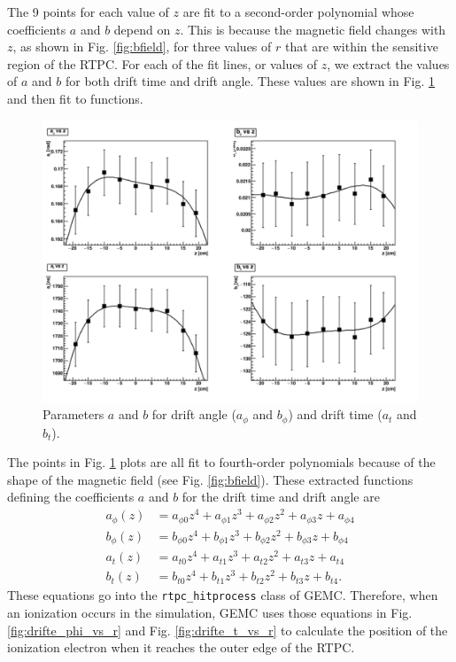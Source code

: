 The 9 points for each value of $z$ are fit to a second-order polynomial whose coefficients $a$ and $b$ depend on $z$. This is because the magnetic field changes with $z$, as shown in Fig. \ref{fig:bfield}, for three values of $r$ that are within the sensitive region of the RTPC. For each of the fit lines, or values of $z$, we extract the values of $a$ and $b$ for both drift time and drift angle. These values are shown in Fig. \ref{fig:drifte_a_and_b} and then fit to functions.

\begin{figure}[h!]
	\centering
	\includegraphics[width=0.8\linewidth]{figures/drifte_a_and_b.png}
	\caption{Parameters $a$ and $b$ for drift angle ($a_{\phi}$ and $b_{\phi}$) and drift time ($a_t$ and $b_t$).}
	\label{fig:drifte_a_and_b}
\end{figure}

The points in Fig. \ref{fig:drifte_a_and_b} plots are all fit to fourth-order polynomials because of the shape of the magnetic field (see Fig. \ref{fig:bfield}). These extracted functions defining the coefficients $a$ and $b$ for the drift time and drift angle are
\begin{eqnarray}\label{eqn:drifte_parameters}
\nonumber
a_{\phi}(z) &= a_{\phi0}z^4 +  a_{\phi1}z^3 +  a_{\phi2}z^2 +  a_{\phi3}z +  a_{\phi4} \\
\nonumber
b_{\phi}(z) &= b_{\phi0}z^4 +  b_{\phi1}z^3 +  b_{\phi2}z^2 +  b_{\phi3}z +  b_{\phi4} \\
\nonumber
a_t(z) &= a_{t0}z^4 +  a_{t1}z^3 +  a_{t2}z^2 +  a_{t3}z +  a_{t4} \\
b_t(z) &= b_{t0}z^4 +  b_{t1}z^3 +  b_{t2}z^2 +  b_{t3}z +  b_{t4}.
\end{eqnarray}
These equations go into the \lstinline|rtpc_hitprocess| class of GEMC. Therefore, when an ionization occurs in the simulation, GEMC uses those equations in Fig. \ref{fig:drifte_phi_vs_r} and Fig. \ref{fig:drifte_t_vs_r} to calculate the position of the ionization electron when it reaches the outer edge of the RTPC.

